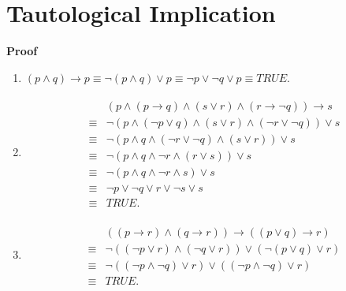 \documentclass{../../cls/sig-alternate-05-2015}
\begin{document}
\section{Tautological Implication}
\textbf{Proof}\begin{enumerate}[label=(\alph*)]
\item $(p \land q) \rightarrow p \equiv \lnot (p \land q) \lor p \equiv \lnot p \lor \lnot q \lor p \equiv TRUE$.
\item \begin{align}
	\begin{aligned}
	& (p \land (p \rightarrow q) \land (s \lor r) \land (r \rightarrow \lnot q)) \rightarrow s\\
	\equiv & \lnot (p \land (\lnot p \lor q) \land (s \lor r) \land (\lnot r \lor \lnot q)) \lor s\\
	\equiv & \lnot (p \land q \land (\lnot r \lor \lnot q) \land (s \lor r)) \lor s\\
	\equiv & \lnot (p \land q \land \lnot r \land (r \lor s)) \lor s\\
	\equiv & \lnot (p \land q \land \lnot r \land s) \lor s\\ \equiv & \lnot p \lor \lnot q \lor r \lor \lnot s \lor s\\
	\equiv & TRUE.
	\end{aligned}
\end{align}
\item \begin{align}
	\begin{aligned}
	& ((p \rightarrow r) \land (q \rightarrow r)) \rightarrow ((p \lor q) \rightarrow r)\\
	\equiv & \lnot ((\lnot p \lor r) \land (\lnot q \lor r)) \lor (\lnot (p \lor q) \lor r)\\
	\equiv & \lnot ((\lnot p \land \lnot q) \lor r) \lor ((\lnot p \land \lnot q) \lor r)\\
	\equiv & TRUE.
	\end{aligned}
\end{align}
\end{enumerate}
\end{document}
